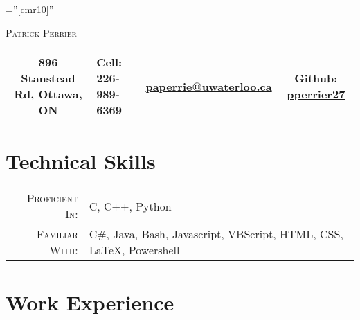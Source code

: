 \documentclass[a4paper,10pt]{article}
\newcommand\Tstrut{\rule{0pt}{2.9ex}}         %
\newcommand\Bstrut{\rule[-1.2ex]{0pt}{0pt}}   %
\newcommand\TBstrut{\Tstrut\Bstrut}           %
\begin{document}
\pagestyle{empty} %

\font\fb=''[cmr10]'' %

\par{\centering
		{\Huge \textsc{Patrick Perrier}
	}\bigskip\par}
\par{
	\begin{tabularx}{\textwidth}{c X X c}
		\hline
		896 Stanstead Rd, Ottawa, ON & Cell: 226-989-6369 
		& \href{mailto:paperrie@uwaterloo.ca}{paperrie@uwaterloo.ca}
		& Github: \href{https://github.com/pperrier27}{pperrier27} \TBstrut \\
		\hline
	\end{tabularx}
}
\section{Technical Skills}

\begin{tabular}{rl}
    \textsc{Proficient In:} & C, C++, Python \\
    \textsc{Familiar With:} & C\#, Java, Bash, Javascript, VBScript, HTML, CSS, \LaTeX, Powershell
\end{tabular}

\section{Work Experience}


\end{document}
